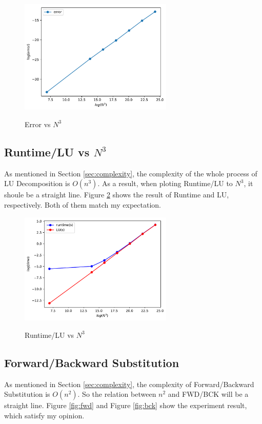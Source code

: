\documentclass{article}
\begin{document}
\begin{figure}[H]
    \centering
    \caption{Error vs $N^3$}
    \includegraphics[width=0.65\textwidth]{src/error.pdf}
    \label{fig:error}
\end{figure}

\subsection{Runtime/LU vs $N^3$}
As mentioned in Section \ref{sec:complexity}, the complexity of the whole process of LU Decomposition is $O(n^3)$. As a result,
when ploting Runtime/LU to $N^3$, it shoule be a straight line. Figure \ref{fig:runtime/LU} shows the result of
Runtime and LU, respectively. Both of them match my expectation.

\begin{figure}[H]
    \centering
    \caption{Runtime/LU vs $N^3$}
    \includegraphics[width=0.65\textwidth]{src/time.pdf}
    \label{fig:runtime/LU}
\end{figure}

\subsection{Forward/Backward Substitution}
As mentioned in Section \ref{sec:complexity}, the complexity of Forward/Backward Substitution is $O(n^2)$. So the relation between
$n^2$ and FWD/BCK will be a straight line. Figure \ref{fig:fwd} and Figure \ref{fig:bck} show the experiment result, which satisfy
my opinion.
\end{document}
